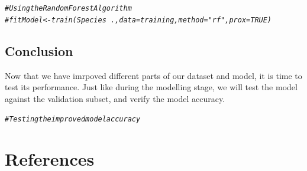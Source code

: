 \documentclass[a4paper,12pt]{article}\usepackage[]{graphicx}\usepackage[]{color}
\makeatletter
\newcommand{\hlcom}[1]{\textcolor[rgb]{0.678,0.584,0.686}{\textit{#1}}}%
\newenvironment{kframe}{%
 \def\at@end@of@kframe{}%
 \ifinner\ifhmode%
  \def\at@end@of@kframe{\end{minipage}}%
  \begin{minipage}{\columnwidth}%
 \fi\fi%
 \def\FrameCommand##1{\hskip\@totalleftmargin \hskip-\fboxsep
 \colorbox{shadecolor}{##1}\hskip-\fboxsep
     \hskip-\linewidth \hskip-\@totalleftmargin \hskip\columnwidth}%
 \MakeFramed {\advance\hsize-\width
   \@totalleftmargin\z@ \linewidth\hsize
   \@setminipage}}%
 {\par\unskip\endMakeFramed%
 \at@end@of@kframe}
\newenvironment{knitrout}{}{} %
\makeatother
\begin{document}
\begin{knitrout}
\color{fgcolor}\begin{kframe}
\begin{alltt}
\hlcom{# Using the Random Forest Algorithm}
\hlcom{#fitModel <- train(Species~.,data=training,method="rf",prox=TRUE)}
\end{alltt}
\end{kframe}
\end{knitrout}

\subsection{Conclusion}\label{improvement_conclusion}
Now that we have imrpoved different parts of our dataset and model, it is time to test its performance. Just like during the modelling stage, we will test the model against the validation subset, and verify the model accuracy.

\begin{knitrout}
\color{fgcolor}\begin{kframe}
\begin{alltt}
\hlcom{# Testing the improved model accuracy}
\end{alltt}
\end{kframe}
\end{knitrout}

\clearpage

\section{References}\label{pubs}

\printbibliography[heading =none]


\clearpage
\end{document}
